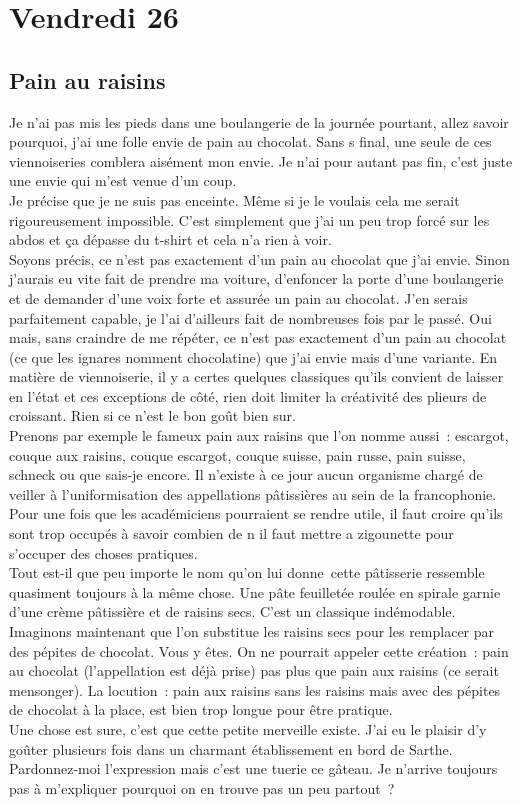 ﻿\section*{Vendredi 26}
\subsection*{Pain au raisins}
Je n’ai pas mis les pieds dans une boulangerie de la journée pourtant, allez savoir pourquoi, j’ai une folle envie de pain au chocolat. Sans s final, une seule de ces viennoiseries comblera aisément mon envie. Je n’ai pour autant pas fin, c’est juste une envie qui m’est venue d’un coup. \\
Je précise que je ne suis pas enceinte. Même si je le voulais cela me serait rigoureusement impossible. C’est simplement que j’ai un peu trop forcé sur les abdos et ça dépasse du t-shirt et cela n’a rien à voir. \\

Soyons précis, ce n’est pas exactement d’un pain au chocolat que j’ai envie. Sinon j’aurais eu vite fait de prendre ma voiture, d’enfoncer la porte d’une boulangerie et de demander d’une voix forte et assurée un pain au chocolat. J’en serais parfaitement capable, je l’ai d’ailleurs fait de nombreuses fois par le passé. Oui mais, sans craindre de me répéter, ce n’est pas exactement d’un pain au chocolat (ce que les ignares nomment chocolatine) que j’ai envie mais d’une variante. En matière de viennoiserie, il y a certes quelques classiques qu’ils convient de laisser en l’état et ces exceptions de côté, rien doit limiter la créativité des plieurs de croissant. Rien si ce n’est le bon goût bien sur. \\

Prenons par exemple le fameux pain aux raisins que l’on nomme aussi : escargot, couque aux raisins, couque escargot, couque suisse, pain russe, pain suisse, schneck ou que sais-je encore. Il n’existe à ce jour aucun organisme chargé de veiller à l’uniformisation des appellations pâtissières au sein de la francophonie. Pour une fois que les académiciens pourraient se rendre utile, il faut croire qu’ils sont trop occupés à savoir combien de n il faut mettre a zigounette pour s’occuper des choses pratiques. \\
Tout est-il que peu importe le nom qu’on lui donne cette pâtisserie ressemble quasiment toujours à la même chose. Une pâte feuilletée roulée en spirale garnie d’une crème pâtissière et de raisins secs. C’est un classique indémodable. Imaginons maintenant que l’on substitue les raisins secs pour les remplacer par des pépites de chocolat. Vous y êtes. On ne pourrait appeler cette création : pain au chocolat (l’appellation est déjà prise) pas plus que pain aux raisins (ce serait mensonger). La locution : pain aux raisins sans les raisins mais avec des pépites de chocolat à la place, est bien trop longue pour être pratique. \\

Une chose est sure, c’est que cette petite merveille existe. J’ai eu le plaisir d’y goûter plusieurs fois dans un charmant établissement en bord de Sarthe. Pardonnez-moi l’expression mais c’est une tuerie ce gâteau. Je n’arrive toujours pas à m’expliquer pourquoi on en trouve pas un peu partout ? 
